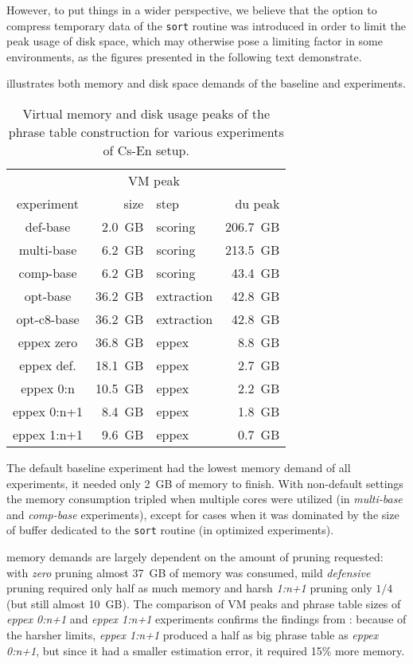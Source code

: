 However, to put things in a wider perspective, we believe that the option to compress temporary data of
the \texttt{sort} routine was introduced in order to limit the peak usage of disk space, which may
otherwise pose a limiting factor in some environments, as the figures presented in the following text
demonstrate.

 illustrates both memory and disk space demands of the baseline
and \eppex{} experiments.

\begin{table}[ht]
\centering
\begin{tabular}{ | c | r l | r | }
\hline
 & \multicolumn{2}{|c|}{VM peak} & \\
experiment & size & step & du peak \\
\hline
\hline
def-base       &  2.0~GB &    scoring & 206.7~GB \\
multi-base     &  6.2~GB &    scoring & 213.5~GB \\
comp-base      &  6.2~GB &    scoring &  43.4~GB \\
opt-base       & 36.2~GB & extraction &  42.8~GB \\
opt-c8-base    & 36.2~GB & extraction &  42.8~GB \\
eppex zero     & 36.8~GB &      eppex &   8.8~GB \\
\hline
eppex def.     & 18.1~GB &      eppex &   2.7~GB \\
eppex 0:n      & 10.5~GB &      eppex &   2.2~GB \\
eppex 0:n+1    &  8.4~GB &      eppex &   1.8~GB \\
eppex 1:n+1    &  9.6~GB &      eppex &   0.7~GB \\
\hline
\end{tabular}
\caption{\label{cs-en-wmt13-vm-and-disk-usage-peaks}
Virtual memory and disk usage peaks of the phrase table construction for various experiments of Cs-En setup.}
\end{table}

The default baseline experiment had the lowest memory demand of all experiments, it needed only 2~GB
of memory to finish.
With non-default settings the memory consumption tripled when multiple cores were utilized (in \emph{multi-base}
and \emph{comp-base} experiments), except for cases when it was dominated by the size of buffer dedicated
to the \texttt{sort} routine (in optimized experiments).

\Eppex{} memory demands are largely dependent on the amount of pruning requested: with \emph{zero}
pruning almost 37~GB of memory was consumed, mild \emph{defensive} pruning required only half as much
memory and harsh \emph{1:n+1} pruning only $1/4$ (but still almost 10~GB).
The comparison of VM peaks and phrase table sizes of \emph{eppex 0:n+1} and \emph{eppex 1:n+1}
experiments confirms the findings from :
because of the harsher limits, \emph{eppex 1:n+1} produced a half as big phrase table as \emph{eppex 0:n+1},
but since it had a smaller estimation error, it required 15\% more memory.

